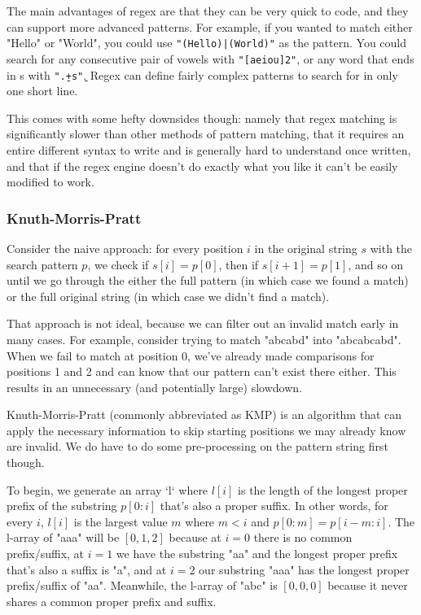 
The main advantages of regex are that they can be very quick to code, and they can support more advanced patterns. For example, if you wanted to match either "Hello" or "World", you could use \texttt{"(Hello)|(World)"} as the pattern. You could search for any consecutive pair of vowels with \texttt{"[aeiou]{2}"}, or any word that ends in s with \texttt{"\b.+s\b"}. Regex can define fairly complex patterns to search for in only one short line.

This comes with some hefty downsides though: namely that regex matching is significantly slower than other methods of pattern matching, that it requires an entire different syntax to write and is generally hard to understand once written, and that if the regex engine doesn't do exactly what you like it can't be easily modified to work.

\subsubsection{Knuth-Morris-Pratt}

Consider the naive approach: for every position $i$ in the original string $s$ with the search pattern $p$, we check if $s[i] = p[0]$, then if $s[i+1] = p[1]$, and so on until we go through the either the full pattern (in which case we found a match) or the full original string (in which case we didn't find a match).

That approach is not ideal, because we can filter out an invalid match early in many cases. For example, consider trying to match "abcabd" into "abcabcabd". When we fail to match at position 0, we've already made comparisons for positions 1 and 2 and can know that our pattern can't exist there either. This results in an unnecessary (and potentially large) slowdown.

Knuth-Morris-Pratt (commonly abbreviated as KMP) is an algorithm that can apply the necessary information to skip starting positions we may already know are invalid. We do have to do some pre-processing on the pattern string first though.

To begin, we generate an array `l` where $l[i]$ is the length of the longest proper prefix of the substring $p[0:i]$ that's also a proper suffix. In other words, for every $i$, $l[i]$ is the largest value $m$ where $m < i$ and $p[0:m] = p[i-m:i]$. The l-array of "aaa" will be $[0,1,2]$ because at $i=0$ there is no common prefix/suffix, at $i=1$ we have the substring "aa" and the longest proper prefix that's also a suffix is "a", and at $i=2$ our substring "aaa" has the longest proper prefix/suffix of "aa". Meanwhile, the l-array of "abc" is $[0,0,0]$ because it never shares a common proper prefix and suffix.

